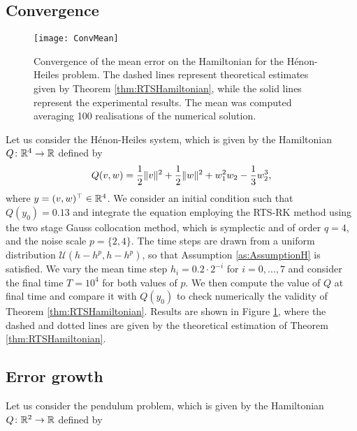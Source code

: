 \documentclass[10pt]{article}
\begin{document}
\subsection{Convergence}\label{sec:NumConv}
\begin{figure}[t!]
	\centering
	\texttt{[image: ConvMean]}
	\caption{Convergence of the mean error on the Hamiltonian for the Hénon-Heiles problem. The dashed lines represent theoretical estimates given by Theorem \ref{thm:RTSHamiltonian}, while the solid lines represent the experimental results. The mean was computed averaging 100 realisations of the numerical solution.}
	\label{fig:Mean}	
\end{figure}

Let us consider the Hénon-Heiles system, which is given by the Hamiltonian $Q \colon \mathbb{R}^4 \to \mathbb{R}$ defined by
\begin{equation}\label{eq:HamHH}
	Q(v, w) = \frac{1}{2}\lVert v\rVert^2 + \frac{1}{2}\lVert w\rVert^2 + w_1^2w_2 - \frac{1}{3}w_2^3,
\end{equation}
where $y = (v, w)^\top \in \mathbb{R}^4$. We consider an initial condition such that $Q(y_0) = 0.13$ and integrate the equation employing the RTS-RK method using the two stage Gauss collocation method, which is symplectic and of order $q = 4$, and the noise scale $p = \{2, 4\}$. The time steps are drawn from a uniform distribution $\mathcal{U}(h-h^p, h-h^p)$, so that Assumption \ref{as:AssumptionH} is satisfied. We vary the mean time step $h_i = 0.2 \cdot 2^{-i}$ for $i = 0, \ldots, 7$ and consider the final time $T = 10^4$ for both values of $p$. We then compute the value of $Q$ at final time and compare it with $Q(y_0)$ to check numerically the validity of Theorem \ref{thm:RTSHamiltonian}. Results are shown in Figure \ref{fig:Mean}, where the dashed and dotted lines are given by the theoretical estimation of Theorem \ref{thm:RTSHamiltonian}.

\subsection{Error growth} Let us consider the pendulum problem, which is given by the Hamiltonian $Q \colon \mathbb{R}^2 \to \mathbb{R}$ defined by
\end{document}
